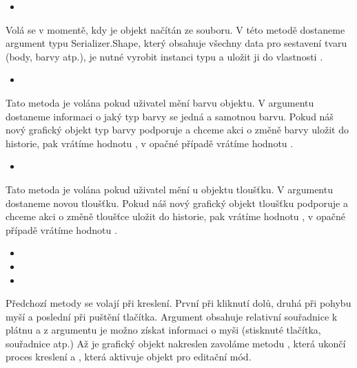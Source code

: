 \documentclass[
  field=inf,
  biblatex,
  glossaries,
  index
]{kidiplom}
\begin{document}
\begin{itemize}
\item {}
\end{itemize}
Volá se v momentě, kdy je objekt načítán ze souboru. V této metodě dostaneme argument typu {Serializer.Shape}, který obsahuje všechny data pro sestavení tvaru (body, barvy atp.), je nutné vyrobit instanci typu  a uložit ji do vlastnosti .


\begin{itemize}
\item {}
\end{itemize}
Tato metoda je volána pokud uživatel mění barvu objektu. V argumentu dostaneme informaci o jaký typ barvy se jedná a samotnou barvu. Pokud náš nový grafický objekt typ barvy podporuje a chceme akci o změně barvy uložit do historie, pak vrátíme hodnotu , v opačné případě vrátíme hodnotu .

\begin{itemize}
\item {}
\end{itemize}
Tato metoda je volána pokud uživatel mění u objektu tloušťku. V argumentu dostaneme novou tloušťku. Pokud náš nový grafický objekt tloušťku podporuje a chceme akci o změně tloušťce uložit do historie, pak vrátíme hodnotu , v opačné případě vrátíme hodnotu .

\begin{itemize}
\item {}
\item {}
\item {}
\end{itemize}
Předchozí metody se volají při kreslení. První při kliknutí dolů, druhá při pohybu myší a poslední při puštění tlačítka. Argument  obsahuje relativní souřadnice k plátnu a z argumentu  je možno získat informaci o myši (stisknuté tlačítka, souřadnice atp.) Až je grafický objekt nakreslen zavoláme metodu , která ukončí proces kreslení a , která aktivuje objekt pro editační mód.
\end{document}
